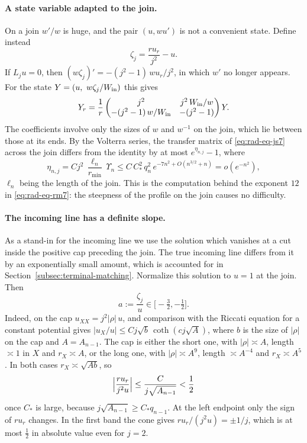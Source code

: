 \paragraph{A state variable adapted to the join.}
On a join $w'/w$ is huge, and the pair $(u,wu')$ is not a convenient
state. Define instead
\begin{equation}\label{eq:rad-eq-js5}
 \zeta_j=\frac{ru_r}{j^2}-u .
\end{equation}
If $L_ju=0$, then $(w\zeta_j)'=-(j^2-1)\,wu_r/j^2$, in which $w'$ no
longer appears. For the state
$Y=(u,\ w\zeta_j/W_{\rm in})$ this gives
\begin{equation}\label{eq:rad-eq-js7}
 Y_r=\frac1r
 \begin{pmatrix}
 j^2&j^2\,W_{\rm in}/w\\
 -(j^2-1)\,w/W_{\rm in}&-(j^2-1)
 \end{pmatrix}Y .
\end{equation}
The coefficients involve only the sizes of $w$ and $w^{-1}$ on the
join, which lie between those at its ends. By the Volterra series,
the transfer matrix of \eqref{eq:rad-eq-js7} across the join differs
from the identity by at most $e^{\eta_{n,j}}-1$, where
\begin{equation}\label{eq:rad-eq-js14}
 \eta_{n,j}=Cj^2\,\frac{\ell_n}{r_{\min}}\,\Upsilon_n
 \le C\,C_*^2\,q_n^2\,e^{-7n^2+O(n^{3/2}+n)}=o(e^{-n^2}),
\end{equation}
$\ell_n$ being the length of the join. This is the computation behind
the exponent $12$ in \eqref{eq:rad-eq-rm7}: the steepness of the
profile on the join causes no difficulty.

\paragraph{The incoming line has a definite slope.}
As a stand-in for the incoming line we use the solution which vanishes
at a cut inside the positive cap preceding the join. The true incoming
line differs from it by an exponentially small amount, which is
accounted for in Section~\ref{subsec:terminal-matching}. Normalize
this solution to $u=1$ at the join. Then
\begin{equation}\label{eq:rad-eq-js6}
 a:=\frac{\zeta_j}{u}\in\bigl[-\tfrac32,-\tfrac12\bigr].
\end{equation}
Indeed, on the cap $u_{XX}=j^2|\rho|\,u$, and comparison with the
Riccati equation for a constant potential gives
$|u_X/u|\le Cj\sqrt b\,\coth(cj\sqrt A)$, where $b$ is the size of
$|\rho|$ on the cap and $A=A_{n-1}$. The cap is either the short one,
with $|\rho|\asymp A$, length $\asymp1$ in $X$ and $r_X\asymp A$, or
the long one, with $|\rho|\asymp A^9$, length $\asymp A^{-4}$ and
$r_X\asymp A^5$. In both cases $r_X\asymp\sqrt{Ab}$, so
\[
 \Bigl|\frac{ru_r}{j^2u}\Bigr|\le\frac{C}{j\sqrt{A_{n-1}}}<\frac12
\]
once $C_*$ is large, because $j\sqrt{A_{n-1}}\ge C_*q_{n-1}$. At the
left endpoint only the sign of $ru_r$ changes. In the first band the
cone gives $ru_r/(j^2u)=\pm1/j$, which is at most $\tfrac12$ in
absolute value even for $j=2$.

